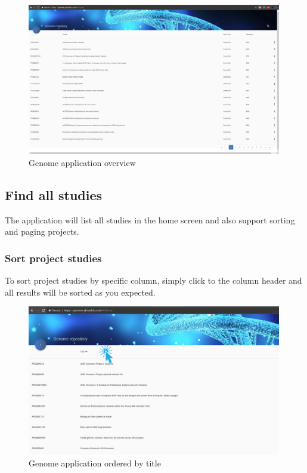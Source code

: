 \documentclass[a4paper,12pt]{article}
\begin{document}
\begin{figure}[H]
\centering
\includegraphics[width=0.99\textwidth]{images/genome-overview}
\caption{Genome application overview}
\end{figure}
\subsection{Find all studies}
The application will list all studies in the home screen and also support sorting and paging projects.
\subsubsection{Sort project studies}
To sort project studies by specific column, simply click to the column header and all results will be sorted as you expected.

\begin{figure}[H]
\centering
\includegraphics[width=0.99\textwidth]{images/genome-order-2}
\caption{Genome application ordered by title}
\end{figure}
\end{document}
